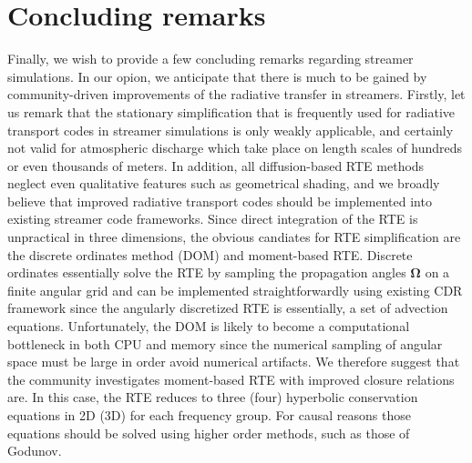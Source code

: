 \documentclass[3p]{elsarticle}
\begin{document}
\section{Concluding remarks}
\label{sec:remarks}
Finally, we wish to provide a few concluding remarks regarding streamer simulations. In our opion, we anticipate that there is much to be gained by community-driven improvements of the radiative transfer in streamers. Firstly, let us remark that the stationary simplification that is frequently used for radiative transport codes in streamer simulations is only weakly applicable, and certainly not valid for atmospheric discharge which take place on length scales of hundreds or even thousands of meters. In addition, all diffusion-based RTE methods neglect even qualitative features such as geometrical shading, and we broadly believe that improved radiative transport codes should be implemented into existing streamer code frameworks. Since direct integration of the RTE is unpractical in three dimensions, the obvious candiates for RTE simplification are the discrete ordinates method (DOM) and moment-based RTE. Discrete ordinates essentially solve the RTE by sampling the propagation angles $\bm{\Omega}$ on a finite angular grid and can be implemented straightforwardly using existing CDR framework since the angularly discretized RTE is essentially, a set of advection equations. Unfortunately, the DOM is likely to become a computational bottleneck in both CPU and memory since the numerical sampling of angular space must be large in order avoid numerical artifacts. We therefore suggest that the community investigates moment-based RTE with improved closure relations are. In this case, the RTE reduces to three (four) hyperbolic conservation equations in 2D (3D) for each frequency group. For causal reasons those equations should be solved using higher order methods, such as those of Godunov. 



\end{document}
